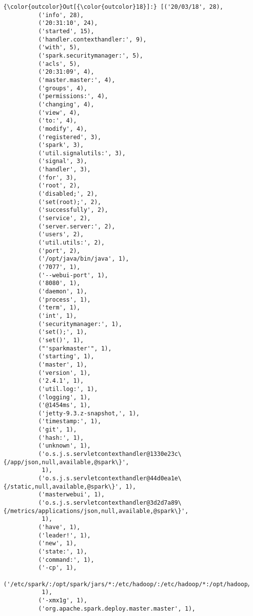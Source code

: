 \documentclass[11pt]{article}
\begin{document}
\begin{Verbatim}[commandchars=\\\{\}]
{\color{outcolor}Out[{\color{outcolor}18}]:} [('20/03/18', 28),
          ('info', 28),
          ('20:31:10', 24),
          ('started', 15),
          ('handler.contexthandler:', 9),
          ('with', 5),
          ('spark.securitymanager:', 5),
          ('acls', 5),
          ('20:31:09', 4),
          ('master.master:', 4),
          ('groups', 4),
          ('permissions:', 4),
          ('changing', 4),
          ('view', 4),
          ('to:', 4),
          ('modify', 4),
          ('registered', 3),
          ('spark', 3),
          ('util.signalutils:', 3),
          ('signal', 3),
          ('handler', 3),
          ('for', 3),
          ('root', 2),
          ('disabled;', 2),
          ('set(root);', 2),
          ('successfully', 2),
          ('service', 2),
          ('server.server:', 2),
          ('users', 2),
          ('util.utils:', 2),
          ('port', 2),
          ('/opt/java/bin/java', 1),
          ('7077', 1),
          ('--webui-port', 1),
          ('8080', 1),
          ('daemon', 1),
          ('process', 1),
          ('term', 1),
          ('int', 1),
          ('securitymanager:', 1),
          ('set();', 1),
          ('set()', 1),
          ("'sparkmaster'", 1),
          ('starting', 1),
          ('master', 1),
          ('version', 1),
          ('2.4.1', 1),
          ('util.log:', 1),
          ('logging', 1),
          ('@1454ms', 1),
          ('jetty-9.3.z-snapshot,', 1),
          ('timestamp:', 1),
          ('git', 1),
          ('hash:', 1),
          ('unknown', 1),
          ('o.s.j.s.servletcontexthandler@1330e23c\{/app/json,null,available,@spark\}',
           1),
          ('o.s.j.s.servletcontexthandler@44d0ea1e\{/static,null,available,@spark\}', 1),
          ('masterwebui', 1),
          ('o.s.j.s.servletcontexthandler@3d2d7a89\{/metrics/applications/json,null,available,@spark\}',
           1),
          ('have', 1),
          ('leader!', 1),
          ('new', 1),
          ('state:', 1),
          ('command:', 1),
          ('-cp', 1),
          ('/etc/spark/:/opt/spark/jars/*:/etc/hadoop/:/etc/hadoop/*:/opt/hadoop/share/hadoop/common/lib/*:/opt/hadoop/share/hadoop/common/*:/opt/hadoop/share/hadoop/hdfs/*:/opt/hadoop/share/hadoop/hdfs/lib/*:/opt/hadoop/share/hadoop/yarn/lib/*:/opt/hadoop/share/hadoop/yarn/*:/opt/hadoop/share/hadoop/mapreduce/lib/*:/opt/hadoop/share/hadoop/mapreduce/*:/opt/hadoop/share/hadoop/tools/lib/*',
           1),
          ('-xmx1g', 1),
          ('org.apache.spark.deploy.master.master', 1),

\end{Verbatim}
\end{document}
